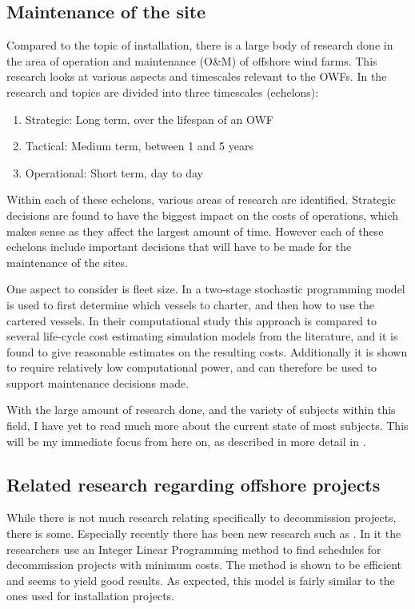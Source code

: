 \documentclass[a4paper,12pt]{article}
\begin{document}
\subsection{Maintenance of the site} \label{ss:maint}

Compared to the topic of installation, there is a large body of research done in the area of operation and maintenance (O\&M) of offshore wind farms. This research looks at various aspects and timescales relevant to the OWFs. In \cite{shafiee2015maintenance} the research and topics are divided into three timescales (echelons):

\begin{enumerate}
\item Strategic: Long term, over the lifespan of an OWF
\item Tactical: Medium term, between 1 and 5 years
\item Operational: Short term, day to day
\end{enumerate}

Within each of these echelons, various areas of research are identified. Strategic decisions are found to have the biggest impact on the costs of operations, which makes sense as they affect the largest amount of time. However each of these echelons include important decisions that will have to be made for the maintenance of the sites. 

One aspect to consider is fleet size. In \cite{staalhane2019optimizing} a two-stage stochastic programming model is used to first determine which vessels to charter, and then how to use the cartered vessels. In their computational study this approach is compared to several life-cycle cost estimating simulation models from the literature, and it is found to give reasonable estimates on the resulting costs. Additionally it is shown to require relatively low computational power, and can therefore be used to support maintenance decisions made. 

With the large amount of research done, and the variety of subjects within this field, I have yet to read much more about the current state of most subjects. This will be my immediate focus from here on, as described in more detail in .

\subsection{Related research regarding offshore projects} \label{ss:offsh}
While there is not much research relating specifically to decommission projects, there is some. Especially recently there has been new research such as \cite{irawan2019optimisation}. In it the researchers use an Integer Linear Programming method to find schedules for decommission projects with minimum costs. The method is shown to be efficient and seems to yield good results. As expected, this model is fairly similar to the ones used for installation projects. 
\end{document}
